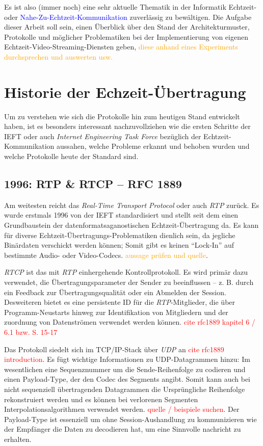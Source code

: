 \documentclass[journal]{IEEEtran}
\begin{document}
\begin{twocolumn}
Es ist also (immer noch) eine sehr aktuelle Thematik in der Informatik
Echtzeit- oder \textcolor{blue}{Nahe-Zu-Echtzeit-Kommunikation} zuverlässig zu
bewältigen. Die Aufgabe dieser Arbeit soll sein, einen Überblick über den
Stand der Architekturmuster, Protokolle und möglicher Problematiken bei der
Implementierung von eigenen Echtzeit-Video-Streaming-Diensten geben,
\textcolor{orange}{diese anhand eines Experiments durchsprechen und auswerten
usw.}

\section{Historie der Echzeit-Übertragung}

Um zu verstehen wie sich die Protokolle hin zum heutigen Stand entwickelt
haben, ist es besonders interessant nachzuvollziehen wie die ersten Schritte
der IEFT oder auch \textit{Internet Engineering Task Force} bezüglich der
Echtzeit-Kommunikation aussahen, welche Probleme erkannt und behoben wurden und
welche Protokolle heute der Standard sind.

\subsection{1996: RTP \& RTCP – RFC 1889}

Am weitesten reicht das \textit{Real-Time Transport Protocol} oder auch
\textit{RTP} zurück. Es wurde erstmals 1996 von der IEFT standardisiert und
stellt seit dem einen Grundbaustein der datenformatsaganostischen
Echtzeit-Übertragung da. Es kann für diverse
Echtzeit-Übertragungs-Problematiken dienlich sein, da jegliche Binärdaten
verschickt werden können; Somit gibt es keinen ``Lock-In'' auf bestimmte Audio-
oder Video-Codecs. \textcolor{orange}{aussage prüfen und quelle}.

\textit{RTCP} ist das mit \textit{RTP} einhergehende Kontrollprotokoll. Es
wird primär dazu verwendet, die Übertragungsparameter der Sender zu
beeinflussen – z. B. durch ein Feedback zur Übertragungsqualität oder ein
Abmelden der Session. Desweiteren bietet es eine persistente ID für die
\textit{RTP}-Mitglieder, die über Programm-Neustarts hinweg zur Identifikation
von Mitgliedern und der zuordnung von Datenströmen verwendet werden können.
\textcolor{red}{cite rfc1889 kapitel 6 / 6.1 bzw. S. 15-17}

Das Protokoll siedelt sich im TCP/IP-Stack über \textit{UDP} an
\textcolor{red}{cite rfc1889 introduction}. Es fügt wichtige Informationen zu
UDP-Datagrammen hinzu: Im wesentlichen eine Sequenznummer um die
Sende-Reihenfolge zu codieren und einen Payload-Type, der den Codec des
Segments angibt. Somit kann auch bei nicht sequenziell übertragenden
Datagrammen die Ursprüngliche Reihenfolge rekonstruiert werden und es können
bei verlorenen Segmenten Interpolationsalgorithmen verwendet werden.
\textcolor{red}{quelle / beispiele suchen}. Der Payload-Type ist essenziell um
ohne Session-Aushandlung zu kommunizieren wie der Empfänger die Daten zu
decodieren hat, um eine Sinnvolle nachricht zu erhalten.


\end{twocolumn}
\end{document}
